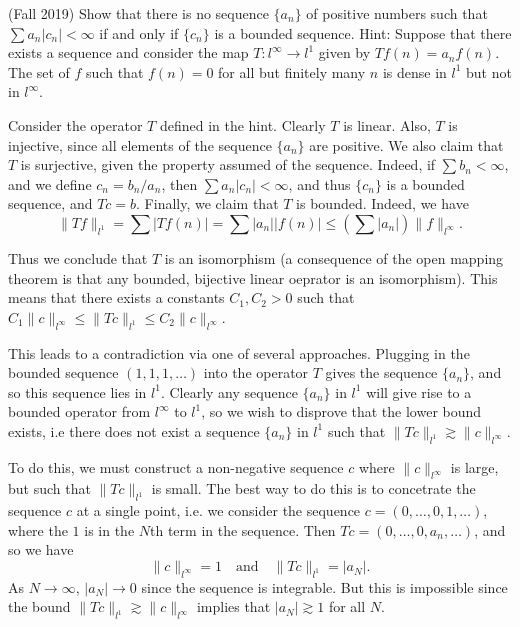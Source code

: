 \documentclass[answers]{exam}
\theoremstyle{problemstyle}
\newcommand{\1}[1]{\textbf{1}_{\left[#1\right]}} %
\begin{document}
\begin{questions}
\question (Fall 2019) Show that there is no sequence $\{ a_n \}$ of positive numbers such that $\sum a_n |c_n| < \infty$ if and only if $\{ c_n \}$ is a bounded sequence. Hint: Suppose that there exists a sequence and consider the map $T: l^\infty \to l^1$ given by $Tf(n) = a_n f(n)$. The set of $f$ such that $f(n) = 0$ for all but finitely many $n$ is dense in $l^1$ but not in $l^\infty$.
\begin{solution}
    Consider the operator $T$ defined in the hint. Clearly $T$ is linear. Also, $T$ is injective, since all elements of the sequence $\{ a_n \}$ are positive. We also claim that $T$ is surjective, given the property assumed of the sequence. Indeed, if $\sum b_n < \infty$, and we define $c_n = b_n/a_n$, then $\sum a_n |c_n| < \infty$, and thus $\{ c_n \}$ is a bounded sequence, and $Tc = b$. Finally, we claim that $T$ is bounded. Indeed, we have
    \[ \| Tf \|_{l^1} = \sum |Tf(n)| = \sum |a_n| |f(n)| \leq \left( \sum |a_n| \right) \| f \|_{l^\infty}. \]
   
   Thus we conclude that $T$ is an isomorphism (a consequence of the open mapping theorem is that any bounded, bijective linear oeprator is an isomorphism). This means that there exists a constants $C_1,C_2 > 0$ such that $C_1 \| c \|_{l^\infty} \leq \| Tc \|_{l^1} \leq C_2 \| c \|_{l^\infty}$.

   This leads to a contradiction via one of several approaches. Plugging in the bounded sequence $(1,1,1,\dots)$ into the operator $T$ gives the sequence $\{ a_n \}$, and so this sequence lies in $l^1$. Clearly any sequence $\{ a_n \}$ in $l^1$ will give rise to a bounded operator from $l^\infty$ to $l^1$, so we wish to disprove that the lower bound exists, i.e there does not exist a sequence $\{ a_n \}$ in $l^1$ such that $\| Tc \|_{l^1} \gtrsim \| c \|_{l^\infty}$.
    
    To do this, we must construct a non-negative sequence $c$ where $\| c \|_{l^\infty}$ is large, but such that $\| Tc \|_{l^1}$ is small. The best way to do this is to concetrate the sequence $c$ at a single point, i.e. we consider the sequence $c = (0,\dots,0,1,\dots)$, where the $1$ is in the $N$th term in the sequence. Then $Tc = (0,\dots,0,a_n,\dots)$, and so we have
    \[ \| c \|_{l^\infty} = 1 \quad\text{and}\quad \| Tc \|_{l^1} = |a_N|. \]
    As $N \to \infty$, $|a_N| \to 0$ since the sequence is integrable. But this is impossible since the bound $\| Tc \|_{l^1} \gtrsim \| c \|_{l^\infty}$ implies that $|a_N| \gtrsim 1$ for all $N$.


\end{solution}
\end{questions}
\end{document}
